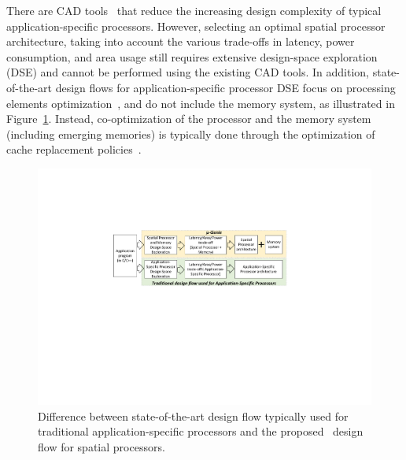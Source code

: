There are CAD tools~\cite{synopsystool,tensilica,codasiptool} that reduce the increasing design complexity of typical application-specific processors. However, selecting an optimal spatial processor architecture, taking into account the various trade-offs in latency, power consumption, and area usage still requires extensive design-space exploration (DSE) and cannot be performed using the existing CAD tools.
In addition, state-of-the-art design flows for application-specific processor DSE focus on processing elements optimization~\cite{Meloni2012,EusseSAMOS2014,Jozwiak2013,Karuri2009}, and do not include the memory system, as illustrated in Figure~\ref{fig:intro}. Instead, co-optimization of the processor and the memory system (including emerging memories) is typically done through the optimization of cache replacement policies~\cite{4798259,7092595,6271803,Mittal13f}.

\begin{figure}[ht]
    \centering
    \includegraphics[clip, trim=6cm 10.5cm 6.4cm 5.2cm, width=1.0\linewidth]{images/intro_figure.pdf} %
    \caption{\small Difference between state-of-the-art design flow typically used for traditional application-specific processors and the proposed \frameworkname~design flow for spatial processors.}
    \label{fig:intro}
\end{figure}

